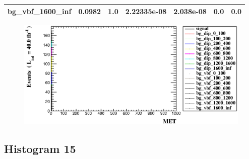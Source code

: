 \documentclass[a4paper, 10pt]{article}
\begin{document}
\begin{table}[H]
\begin{center}
\begin{tabular}{|m{23.0mm}|m{23.0mm}|m{18.0mm}|m{19.0mm}|m{19.0mm}|m{19.0mm}|m{19.0mm}|}
      \hline
      {\cellcolor{white}         bg\_vbf\_1600\_inf}& {\cellcolor{white}         0.0982}& {\cellcolor{white}         1.0}& {\cellcolor{white}         2.22335e-08}& {\cellcolor{white}         2.038e-08}& {\cellcolor{green}         0.0}& {\cellcolor{green}         0.0}\\
\hline
    \end{tabular}
  \end{center}
\end{table}

\begin{figure}[H]
  \begin{center}
    \includegraphics[scale=0.45]{selection_13.eps}\\
\caption{   }
  \end{center}
\end{figure}
      \newpage
\subsection{ Histogram 15}
\end{document}
